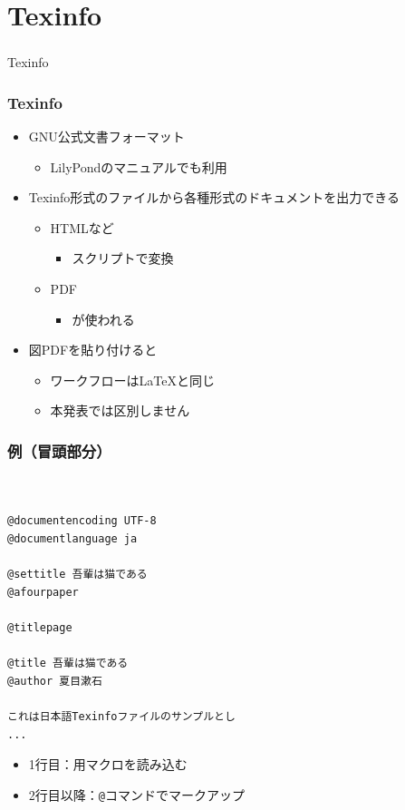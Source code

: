 \documentclass[unicode,17pt]{beamer}
\begin{document}
\section{Texinfo}
\begin{frame}\frametitle{}
  \centering
  Texinfo
\end{frame}

\begin{frame}\frametitle{Texinfo}
  \begin{itemize}
  \item GNU公式文書フォーマット
    \begin{itemize}
    \item LilyPondのマニュアルでも利用
    \end{itemize}
  \item Texinfo形式のファイルから各種形式のドキュメントを出力できる
    \begin{itemize}
    \item HTMLなど
      \begin{itemize}
      \item スクリプトで変換
      \end{itemize}
    \item PDF
      \begin{itemize}
      \item {}が使われる
      \end{itemize}
    \end{itemize}
  \item 図PDFを貼り付けると
    \begin{itemize}
    \item ワークフローは\LaTeX と同じ
    \item 本発表では区別しません
    \end{itemize}
  \end{itemize}
\end{frame}

\begin{frame}[fragile]\frametitle{例（冒頭部分）}
  \centering
  \begin{tcolorbox}[width=0.6\linewidth,left=0mm,right=0mm,top=0mm,bottom=0mm]
    \begin{lstlisting}


@documentencoding UTF-8
@documentlanguage ja

@settitle 吾輩は猫である
@afourpaper

@titlepage

@title 吾輩は猫である
@author 夏目漱石

これは日本語Texinfoファイルのサンプルとし
...
    \end{lstlisting}
  \end{tcolorbox}
  \begin{itemize}
  \item 1行目：用マクロを読み込む
  \item 2行目以降：\verb|@|コマンドでマークアップ
  \end{itemize}
\end{frame}
\end{document}
